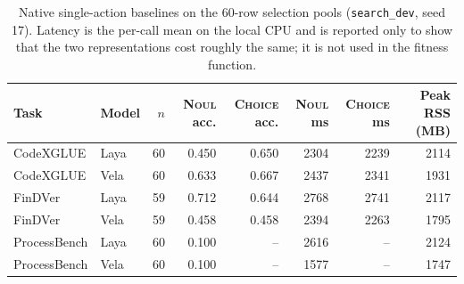 \begin{table}[t]
\centering
\small
\caption{Native single-action baselines on the 60-row selection pools
(\texttt{search\_dev}, seed 17). Latency is the per-call mean on the local CPU
and is reported only to show that the two representations cost roughly the
same; it is not used in the fitness function.}
\label{tab:native}
\begin{tabular}{@{}llrrrrrr@{}}
\toprule
Task & Model & $n$ & \textsc{Noul} acc. & \textsc{Choice} acc. & \textsc{Noul} ms & \textsc{Choice} ms & Peak RSS (MB) \\
\midrule
CodeXGLUE & Laya & 60 & 0.450 & 0.650 & 2304 & 2239 & 2114 \\
CodeXGLUE & Vela & 60 & 0.633 & 0.667 & 2437 & 2341 & 1931 \\
FinDVer & Laya & 59 & 0.712 & 0.644 & 2768 & 2741 & 2117 \\
FinDVer & Vela & 59 & 0.458 & 0.458 & 2394 & 2263 & 1795 \\
ProcessBench & Laya & 60 & 0.100 & -- & 2616 & -- & 2124 \\
ProcessBench & Vela & 60 & 0.100 & -- & 1577 & -- & 1747 \\
\bottomrule
\end{tabular}
\end{table}
